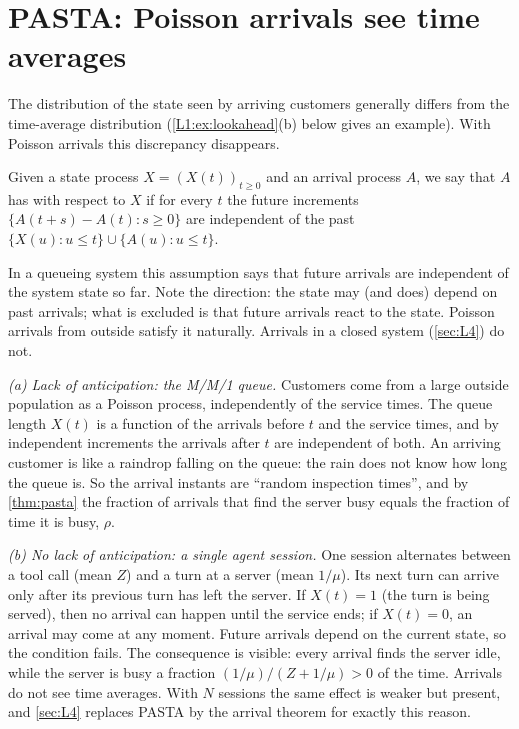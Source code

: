 \section{PASTA: Poisson arrivals see time averages}

The distribution of the state seen by arriving customers generally differs from the
time-average distribution (\cref{L1:ex:lookahead}(b) below gives an example). With
Poisson arrivals this discrepancy disappears.

\begin{definition}\label{L1:def:lookahead}
Given a state process $X=(X(t))_{t\ge0}$ and an arrival process $A$, we say that $A$
has  with respect to $X$ if for every $t$ the future
increments $\{A(t+s)-A(t):s\ge0\}$ are independent of the past
$\{X(u):u\le t\}\cup\{A(u):u\le t\}$.
\end{definition}

In a queueing system this assumption says that future arrivals are independent of the
system state so far. Note the direction: the state may (and does) depend on past
arrivals; what is excluded is that future arrivals react to the state. Poisson arrivals
from outside satisfy it naturally. Arrivals in a closed system (\cref{sec:L4}) do not.

\begin{example}\label{L1:ex:lookahead}
\emph{(a) Lack of anticipation: the M/M/1 queue.} Customers come from a large outside
population as a Poisson process, independently of the service times. The queue length
$X(t)$ is a function of the arrivals before $t$ and the service times, and by
independent increments the arrivals after $t$ are independent of both. An arriving
customer is like a raindrop falling on the queue: the rain does not know how long the
queue is. So the arrival instants are ``random inspection times'', and by
\cref{thm:pasta} the fraction of arrivals that find the server busy equals the fraction
of time it is busy, $\rho$.

\emph{(b) No lack of anticipation: a single agent session.} One session alternates
between a tool call (mean $Z$) and a turn at a server (mean $1/\mu$). Its
next turn can arrive only after its previous turn has left the server. If $X(t)=1$
(the turn is being served), then no arrival can happen until the service ends; if
$X(t)=0$, an arrival may come at any moment. Future arrivals depend on the current
state, so the condition fails. The consequence is visible: every arrival finds the
server idle, while the server is busy a fraction $(1/\mu)/(Z+1/\mu)>0$ of the time.
Arrivals do not see time averages. With $N$ sessions the same effect is weaker but
present, and \cref{sec:L4} replaces PASTA by the arrival theorem for exactly this
reason.
\end{example}

